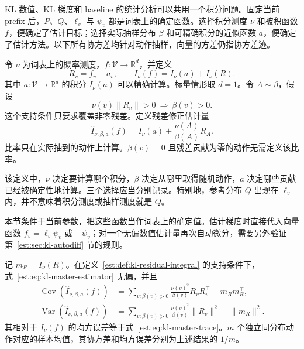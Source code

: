 \documentclass[lang=cn,scheme=chinese,openany]{../book/elegantbook}
\newcommand{\Var}{\operatorname{Var}}
\begin{document}
KL 数值、KL 梯度和 baseline 的统计分析可以共用一个积分问题。固定当前 prefix 后，$P$、$Q$、$\ell_v$ 与 $\psi_v$ 都是词表上的确定函数。选择积分测度 $\nu$ 和被积函数 $f$，便确定了估计目标；选择实际抽样分布 $\beta$ 和可精确积分的近似函数 $a$，便确定了估计方法。以下所有协方差均针对动作抽样，向量的方差仍指协方差迹。

\begin{definition}[可精确积分的近似函数与残差]
\label{est:def:kl-residual-integral}
令 $\nu$ 为词表上的概率测度，$f:\mathcal V\to\mathbb R^d$，并定义
\begin{equation*}
 R_v=f_v-a_v,\qquad I_\nu(f)=I_\nu(a)+I_\nu(R).
\end{equation*}
其中 $a:\mathcal V\to\mathbb R^d$ 的积分 $I_\nu(a)$ 可以精确计算。标量情形取 $d=1$。令 $A\sim\beta$，假设
\begin{equation*}
 \nu(v)\lVert R_v\rVert>0\ \Longrightarrow\ \beta(v)>0.
\end{equation*}
这个支持条件只要求覆盖非零残差。定义残差修正估计量
\begin{equation}
 \widehat I_{\nu,\beta,a}(f)
 =I_\nu(a)+\frac{\nu(A)}{\beta(A)}R_A.
 \label{est:eq:kl-master-estimator}
\end{equation}
比率只在实际抽到的动作上计算。$\beta(v)=0$ 且残差贡献为零的动作无需定义该比率。
\end{definition}

该定义中，$\nu$ 决定要计算哪个积分，$\beta$ 决定从哪里取得随机动作，$a$ 决定哪些贡献已经被确定性地计算。三个选择应当分别记录。特别地，参考分布 $Q$ 出现在 $\ell_v$ 内，并不意味着积分测度或抽样测度就是 $Q$。

本节条件于当前参数，把这些函数当作词表上的确定值。估计梯度时直接代入向量函数 $f_v=\ell_v\psi_v$ 或 $-\psi_v$；对一个无偏数值估计量再次自动微分，需要另外验证第~\ref{est:sec:kl-autodiff} 节的规则。

\begin{theorem}
\label{est:thm:kl-master-moments}
记 $m_R=I_\nu(R)$。在定义~\ref{est:def:kl-residual-integral} 的支持条件下，式~\eqref{est:eq:kl-master-estimator} 无偏，并且
\begin{align}
 \operatorname{Cov}(\widehat I_{\nu,\beta,a}(f))
 &=\sum_{v:\beta(v)>0}\frac{\nu(v)^2}{\beta(v)}R_vR_v^\top-m_Rm_R^\top,
 \label{est:eq:kl-master-cov}\\
 \Var(\widehat I_{\nu,\beta,a}(f))
 &=\sum_{v:\beta(v)>0}\frac{\nu(v)^2}{\beta(v)}\lVert R_v\rVert^2-\lVert m_R\rVert^2.
 \label{est:eq:kl-master-trace}
\end{align}
其相对于 $I_\nu(f)$ 的均方误差等于式~\eqref{est:eq:kl-master-trace}。$m$ 个独立同分布动作对应的样本均值，其协方差和均方误差分别为上述结果的 $1/m$。
\end{theorem}
\end{document}
